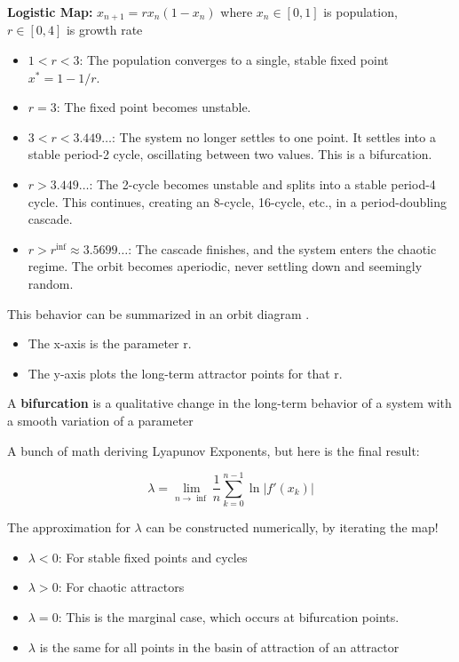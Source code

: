 \textbf{Logistic Map:} $x_{n+1} = r x_n (1 - x_n)$ where $x_n \in [0, 1]$ is 
population, $r \in [0, 4]$ is growth rate

\begin{itemize}
    \item $1<r<3$: The population converges to a single, stable fixed point $x^*=1-1/r$.
    \item $r=3$: The fixed point becomes unstable.
    \item $3<r<3.449\dots$: The system no longer settles to one point. It settles into a stable period-2 cycle, oscillating between two values. This is a bifurcation.
    \item $r>3.449\dots$: The 2-cycle becomes unstable and splits into a stable period-4 cycle. This continues, creating an 8-cycle, 16-cycle, etc., in a period-doubling cascade.
    \item $r>r^{\inf} \approx 3.5699\dots$: The cascade finishes, and the system enters the chaotic regime. The orbit becomes aperiodic, never settling down and seemingly random.
\end{itemize}

This behavior can be summarized in an orbit diagram .
\begin{itemize}
    \item The x-axis is the parameter r.
    \item The y-axis plots the long-term attractor points for that r.
\end{itemize}    

A \textbf{bifurcation} is a qualitative change in the long-term behavior
of a system with a smooth variation of a parameter
    
A bunch of math deriving Lyapunov Exponents, but here is the final result:

\[\lambda = \lim_{n \to \inf} \frac{1}{n} \sum_{k=0}^{n-1} \ln|f'(x_k)|\]

The approximation for $\lambda$ can be constructed numerically, by iterating the map!
\begin{itemize}
    \item $\lambda < 0$: For stable fixed points and cycles
    \item $\lambda > 0$: For chaotic attractors
    \item $\lambda = 0$: This is the marginal case, which occurs at bifurcation points.
    \item $\lambda$ is the same for all points in the basin of attraction of an attractor
\end{itemize} 
    


